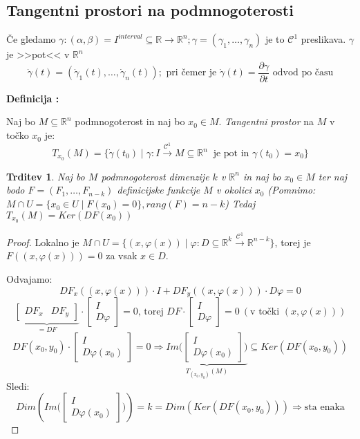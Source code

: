 \documentclass[a4paper, 10pt]{article}
\newtheorem{trditev}{Trditev}
\newcounter{defcount}
\newenvironment{definicija}{\begin{flushleft}\stepcounter{defcount}\textbf{Definicija \arabic{defcount}:}}{\hfill\end{flushleft}}
\newcommand{\mth}[1]{\ensuremath{\mathbb{#1}}}
\newcommand{\R}{\mth{R}}
\newcommand{\pojem}[1]{\emph{#1}}
\newcommand{\con}{\ensuremath{\mathscr{C}}}
\begin{document}
\subsection{Tangentni prostori na podmnogoterosti}

Če gledamo $\gamma: (\alpha, \beta) = I^{interval} \subseteq \R \rightarrow \R^n; \gamma = (\gamma_1, \ldots, \gamma_n)$ je to $\con^1$ preslikava. $\gamma$ je >>pot<< v $\R^n$
\[
\dot{\gamma}(t) = (\dot{\gamma}_1(t), \ldots, \dot{\gamma}_n(t));\text{~pri čemer je~} \dot{\gamma}(t) = \frac{\partial\gamma}{\partial t} \text{~odvod po času}
\]

\begin{definicija}

Naj bo $M \subseteq \R^n$ podmnogoterost in naj bo $x_0 \in M$. \pojem{Tangentni prostor} na $M$ v točko $x_0$ je:
\[
T_{x_0}(M) = \{\dot{\gamma}(t_0)\mid \gamma : I \xrightarrow{\con^1} M \subseteq \R^n\ \text{~je pot in~} \gamma(t_0) = x_0\}
\]
\end{definicija}

\begin{trditev}

Naj bo $M$ podmnogoterost dimenzije $k$ v $\R^n$ in naj bo $x_0 \in M$ ter naj bodo $F = (F_1, \ldots, F_{n - k})$ definicijske funkcije $M$ v okolici $x_0$ (Pomnimo: $M \cap U = \{x_0 \in U \mid F(x_0) = 0\}, rang(F) = n - k $)
Tedaj $T_{x_0}(M) = Ker(DF(x_0))$

\end{trditev}

\begin{proof}

Lokalno je $M \cap U = \{ (x, \varphi(x))\mid \varphi: D\subseteq \R^k \xrightarrow{\con^1} \R^{n - k}\}$, torej je $F((x, \varphi(x))) = 0$ za vsak $x\in D$.

Odvajamo:
\[
DF_x((x, \varphi(x))) \cdot I + DF_y((x, \varphi(x))) \cdot D\varphi = 0
\]
\[
\underbrace{\begin{bmatrix}
DF_x & DF_y
\end{bmatrix}}_{=DF}
\cdot
\begin{bmatrix}
I \\
D\varphi
\end{bmatrix} 
= 0 \text{,~torej~} DF \cdot
\begin{bmatrix}
I \\
D\varphi
\end{bmatrix} = 0 ~(\text{v točki~} (x, \varphi(x)))
\]
\[
DF(x_0, y_0) \cdot
\begin{bmatrix}
I \\
D\varphi(x_0)
\end{bmatrix} = 0 
\Rightarrow
\underbrace{Im\bigg(\begin{bmatrix}
I \\
D\varphi(x_0)
\end{bmatrix}\bigg)}_{T_{(x_0, y_0)}(M)} \subseteq Ker(DF(x_0, y_0))
\]
Sledi:
\[
Dim(Im\bigg(\begin{bmatrix}
I \\
D\varphi(x_0)
\end{bmatrix}\bigg)) = k = Dim(Ker(DF(x_0, y_0))) \Rightarrow \text{sta enaka}
\]
\end{proof}
\end{document}
